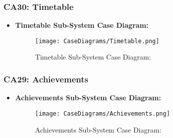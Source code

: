 \documentclass[12pt,a4paper]{article}
\begin{document}
		\subsubsection{CA30: Timetable}
			\begin{itemize}
				\item \textbf{Timetable Sub-System Case Diagram:}
				\begin{figure}[H]
					\texttt{[image: CaseDiagrams/Timetable.png]}
					\caption{Timetable Sub-System Case Diagram:}
				\end{figure}
			\end{itemize}
		\subsubsection{CA29: Achievements}
			\begin{itemize}
				\item \textbf{Achievements Sub-System Case Diagram:}
				\begin{figure}[H]
					\texttt{[image: CaseDiagrams/Achievements.png]}
					\caption{Achievements Sub-System Case Diagram:}
				\end{figure}
			\end{itemize}
		\newpage
\end{document}
